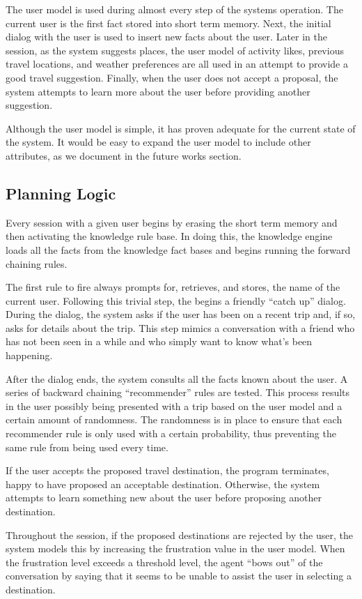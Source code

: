 \documentclass[11pt]{article} %
\begin{document}
The user model is used during almost every step of the systems operation. The current user is the first fact stored into short term memory. Next, the initial dialog with the user is used to insert new facts about the user. Later in the session, as the system suggests places, the user model of activity likes, previous travel locations, and weather preferences are all used in an attempt to provide a good travel suggestion. Finally, when the user does not accept a proposal, the system attempts to learn more about the user before providing another suggestion.

Although the user model is simple, it has proven adequate for the current state of the system. It would be easy to expand the user model to include other attributes, as we document in the future works section.

\subsection{Planning Logic}
Every session with a given user begins by erasing the short term memory and then activating the knowledge rule base. In doing this, the knowledge engine loads all the facts from the knowledge fact bases and begins running the forward chaining rules.

The first rule to fire always prompts for, retrieves, and stores, the name of the current user. Following this trivial step, the begins a friendly ``catch up'' dialog. During the dialog, the system asks if the user has been on a recent trip and, if so, asks for details about the trip. This step mimics a conversation with a friend who has not been seen in a while and who simply want to know what's been happening.

After the dialog ends, the system consults all the facts known about the user. A series of backward chaining ``recommender'' rules are tested. This process results in the user possibly being presented with a trip based on the user model and a certain amount of randomness. The randomness is in place to ensure that each recommender rule is only used with a certain probability, thus preventing the same rule from being used every time.

If the user accepts the proposed travel destination, the program terminates, happy to have proposed an acceptable destination. Otherwise, the system attempts to learn something new about the user before proposing another destination.

Throughout the session, if the proposed destinations are rejected by the user, the system models this by increasing the frustration value in the user model. When the frustration level exceeds a threshold level, the agent ``bows out'' of the conversation by saying that it seems to be unable to assist the user in selecting a destination.
\end{document}
